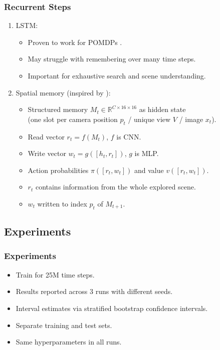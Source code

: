 \begin{frame}
    \frametitle{Recurrent Steps}

    \begin{enumerate}
        \item LSTM:
        \begin{itemize}
            \item Proven to work for POMDPs \cite{hausknecht_stone_2017,mnih_asynchronous_2016,mirowski_navigate_2017,gupta_cognitive_2019}.
            \item May struggle with remembering over many time steps.
            \item Important for exhaustive search and scene understanding.
        \end{itemize}
        \item Spatial memory (inspired by \cite{parisotto_salakhutdinov_2017}):
        \begin{itemize}
            \item Structured memory \(M_t \in \mathbb{R}^{C \times 16 \times 16}\) as hidden state \\
            (one slot per camera position \(p_t\) / unique view \(V\) / image \(x_t\)).
            \item Read vector \(r_t = f(M_t)\), \(f\) is CNN.
            \item Write vector \(w_t = g(\left\lbrack h_t, r_t \right\rbrack)\), \(g\) is MLP.
            \item Action probabilities \(\pi(\left\lbrack r_t, w_t \right\rbrack)\) and value \(v(\left\lbrack r_t, w_t \right\rbrack)\).
            \item \(r_t\) contains information from the whole explored scene.
            \item \(w_t\) written to index \(p_t\) of \(M_{t+1}\).
        \end{itemize}
    \end{enumerate}
\end{frame}

\subsection{Experiments}

\begin{frame}
    \frametitle{Experiments}

    \begin{itemize}
        \item Train for 25M time steps.
        \item Results reported across 3 runs with different seeds.
        \item Interval estimates via stratified bootstrap confidence intervals.
        \item Separate training and test sets.
        \item Same hyperparameters in all runs.
    \end{itemize}
\end{frame}


